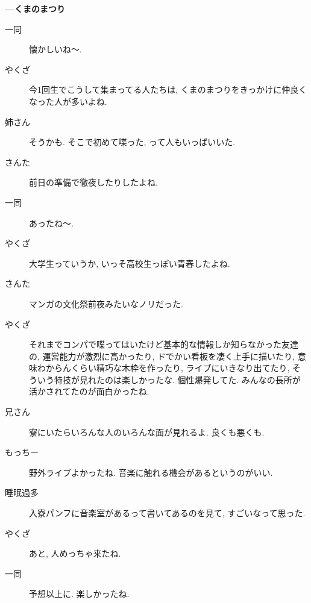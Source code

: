 \documentclass[10pt,b5jsbook,dvips,dvipdfmx,openany]{jsbook}
\theoremstyle{definition}
\begin{document}

		\textbf{---くまのまつり}
		\begin{description}
		\item[ 一同 ]懐かしいね〜.
		\item[やくざ]今1回生でこうして集まってる人たちは, くまのまつりをきっかけに仲良くなった人が多いよね.
		\item[姉さん]そうかも. そこで初めて喋った, って人もいっぱいいた.
		\item[さんた]前日の準備で徹夜したりしたよね.
		\item[ 一同 ]あったね〜.
		\item[やくざ]大学生っていうか, いっそ高校生っぽい青春したよね.
		\item[さんた]マンガの文化祭前夜みたいなノリだった.
		\item[やくざ]それまでコンパで喋ってはいたけど基本的な情報しか知らなかった友達の, 運営能力が激烈に高かったり, ドでかい看板を凄く上手に描いたり, 意味わからんくらい精巧な木枠を作ったり, ライブにいきなり出てたり, そういう特技が見れたのは楽しかったな. 個性爆発してた. みんなの長所が活かされてたのが面白かったね.
		\item[兄さん]寮にいたらいろんな人のいろんな面が見れるよ. 良くも悪くも.
		\item[もっちー]野外ライブよかったね. 音楽に触れる機会があるというのがいい.
		\item[睡眠過多]入寮パンフに音楽室があるって書いてあるのを見て, すごいなって思った.
		\item[やくざ]あと, 人めっちゃ来たね.
		\item[ 一同 ]予想以上に. 楽しかったね.
		\end{description}
\end{document}
